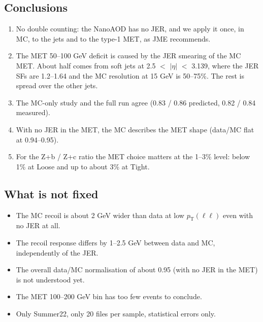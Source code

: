 \documentclass[11pt,a4paper]{article}
\newcommand{\aeta}{$|\eta|$}
\begin{document}
\subsection{Conclusions}
\begin{enumerate}
\item No double counting: the NanoAOD has no JER, and we apply it once, in MC, to the jets and to the type-1 MET, as JME recommends.
\item The MET 50--100 GeV deficit is caused by the JER smearing of the MC MET. About half comes from soft jets at 2.5 $<$ \aeta{} $<$ 3.139,
where the JER SFs are 1.2--1.64 and the MC resolution at 15 GeV is 50--75\%. The rest is spread over the other jets.
\item The MC-only study and the full run agree (0.83 / 0.86 predicted, 0.82 / 0.84 measured).
\item With no JER in the MET, the MC describes the MET shape (data/MC flat at 0.94--0.95).
\item For the Z+b / Z+c ratio the MET choice matters at the 1--3\% level: below 1\% at Loose and up to about 3\% at Tight.
\end{enumerate}

\subsection{What is not fixed}
\begin{itemize}
\item The MC recoil is about 2 GeV wider than data at low $p_\mathrm{T}(\ell\ell)$ even with no JER at all.
\item The recoil response differs by 1--2.5 GeV between data and MC, independently of the JER.
\item The overall data/MC normalisation of about 0.95 (with no JER in the MET) is not understood yet.
\item The MET 100--200 GeV bin has too few events to conclude.
\item Only Summer22, only 20 files per sample, statistical errors only.
\end{itemize}
\end{document}
